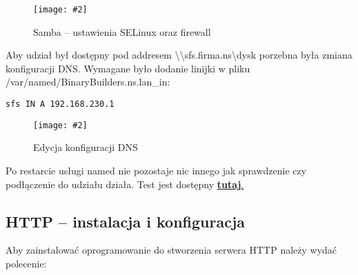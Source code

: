 \documentclass[a4paper]{article}
\newcommand*{\zdj}[2][\textwidth]{\texttt{[image: \#2]}}
\newcommand*{\fg}[4][!htb]{
      \begin{figure*}[#1]
            \zdj{#2}
            \caption[#4]{#3}
      \end{figure*}
}
\begin{document}
      
      
\fg{contents/configuration/Samba/4.png}{Samba – ustawienia SELinux oraz firewall}{Samba – ustawienia SELinux oraz firewall}

Aby udział był dostępny pod addresem \textbackslash \textbackslash sfs.firma.ns\textbackslash dysk porzebna była zmiana konfiguracji DNS. Wymagane było dodanie linijki w pliku /var/named/BinaryBuilders.ns.lan\_in: 
\begin{Verbatim}[frame=single]
sfs IN A 192.168.230.1
\end{Verbatim}
\fg{contents/configuration/Samba/5 - edycja BinaryBuilders.ns.lan_in.png}{Edycja konfiguracji DNS}{Edycja konfiguracji DNS}

Po restarcie usługi named nie pozostaje nic innego jak sprawdzenie czy podłączenie do udziału działa. Test jest dostępny \hyperref[fig:samba-try-connection]{\textbf{tutaj}.}



\subsection{HTTP – instalacja i konfiguracja}
Aby zainstalować oprogramowanie do stworzenia serwera HTTP należy wydać
polecenie: 
\end{document}
